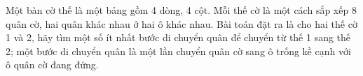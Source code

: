 Một bàn cờ thế là một bảng gồm 4 dòng, 4 cột. Mỗi thế cờ là một cách sắp xếp 8 quân cờ, hai quân khác nhau ở hai ô khác nhau.            Bài toán đặt ra là cho hai thế cờ 1 và 2, hãy tìm một số ít nhất bước di chuyển quân để chuyển từ thế 1 sang thế 2; một bước di chuyển quân là một lần chuyển quân cờ sang ô trống kề cạnh với ô quân cờ đang đứng.